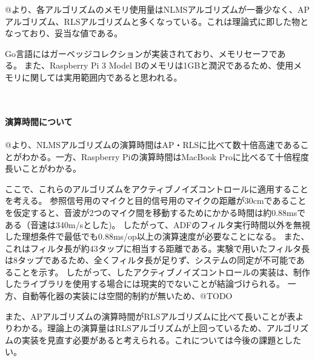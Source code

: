 @より、各アルゴリズムのメモリ使用量はNLMSアルゴリズムが一番少なく、APアルゴリズム、RLSアルゴリズムと多くなっている。これは理論式に即した物となっており、妥当な値である。

Go言語にはガーベッジコレクションが実装されており、メモリセーフである。また、Raspberry
Pi 3 Model
Bのメモリは1GBと潤沢であるため、使用メモリに関しては実用範囲内であると思われる。

\
\paragraph{演算時間について}\label{ux6f14ux7b97ux6642ux9593ux306bux3064ux3044ux3066}

@より、NLMSアルゴリズムの演算時間はAP・RLSに比べて数十倍高速であることがわかる。一方、Raspberry
Piの演算時間はMacBook Proに比べるて十倍程度長いことがわかる。

ここで、これらのアルゴリズムをアクティブノイズコントロールに適用することを考える。
参照信号用のマイクと目的信号用のマイクの距離が30cmであることを仮定すると、音波が2つのマイク間を移動するためにかかる時間は約0.88msである（音速は340m/sとした)。
したがって、ADFのフィルタ実行時間以外を無視した理想条件で最低でも0.88ms/op以上の演算速度が必要なことになる。
また、これはフィルタ長が約43タップに相当する距離である。実験で用いたフィルタ長は8タップであるため、全くフィルタ長が足りず、システムの同定が不可能であることを示す。
したがって、したアクティブノイズコントロールの実装は、制作したライブラリを使用する場合には現実的でないことが結論づけられる。
一方、自動等化器の実装には空間的制約が無いため、@TODO

また、APアルゴリズムの演算時間がRLSアルゴリズムに比べて長いことが表よりわかる。理論上の演算量はRLSアルゴリズムが上回っているため、アルゴリズムの実装を見直す必要があると考えられる。これについては今後の課題としたい。
